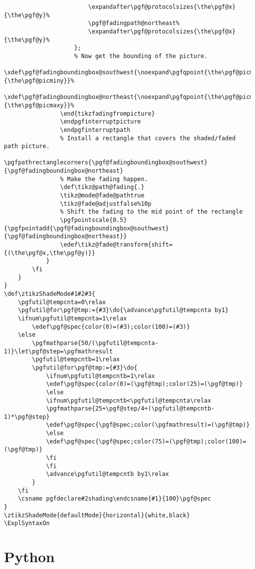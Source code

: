 \begin{verbatim}
                        \expandafter\pgf@protocolsizes{\the\pgf@x}{\the\pgf@y}%
                        \pgf@fadingpath@northeast%
                        \expandafter\pgf@protocolsizes{\the\pgf@x}{\the\pgf@y}%
                    };
                    % Now get the bounding of the picture.
                    \xdef\pgf@fadingboundingbox@southwest{\noexpand\pgfqpoint{\the\pgf@picminx}{\the\pgf@picminy}}%
                    \xdef\pgf@fadingboundingbox@northeast{\noexpand\pgfqpoint{\the\pgf@picmaxx}{\the\pgf@picmaxy}}%
                \end{tikzfadingfrompicture}
                \endpgfinterruptpicture
                \endpgfinterruptpath
                % Install a rectangle that covers the shaded/faded path picture.                                
                \pgfpathrectanglecorners{\pgf@fadingboundingbox@southwest}{\pgf@fadingboundingbox@northeast}
                % Make the fading happen.
                \def\tikz@path@fading{.}
                \tikz@mode@fade@pathtrue
                \tikz@fade@adjustfalse%10p
                % Shift the fading to the mid point of the rectangle
                \pgfpointscale{0.5}{\pgfpointadd{\pgf@fadingboundingbox@southwest}{\pgf@fadingboundingbox@northeast}}
                \edef\tikz@fade@transform{shift={(\the\pgf@x,\the\pgf@y)}}
            }
        \fi
    }
}
\def\ztikzShadeMode#1#2#3{
    \pgfutil@tempcnta=0\relax
    \pgfutil@for\pgf@tmp:={#3}\do{\advance\pgfutil@tempcnta by1}
    \ifnum\pgfutil@tempcnta=1\relax
        \edef\pgf@spec{color(0)=(#3);color(100)=(#3)}
    \else
        \pgfmathparse{50/(\pgfutil@tempcnta-1)}\let\pgf@step=\pgfmathresult
        \pgfutil@tempcntb=1\relax
        \pgfutil@for\pgf@tmp:={#3}\do{
            \ifnum\pgfutil@tempcntb=1\relax
            \edef\pgf@spec{color(0)=(\pgf@tmp);color(25)=(\pgf@tmp)}
            \else
            \ifnum\pgfutil@tempcntb<\pgfutil@tempcnta\relax
            \pgfmathparse{25+\pgf@step/4+(\pgfutil@tempcntb-1)*\pgf@step}
            \edef\pgf@spec{\pgf@spec;color(\pgfmathresult)=(\pgf@tmp)}
            \else
            \edef\pgf@spec{\pgf@spec;color(75)=(\pgf@tmp);color(100)=(\pgf@tmp)}
            \fi
            \fi
            \advance\pgfutil@tempcntb by1\relax
        }
    \fi
    \csname pgfdeclare#2shading\endcsname{#1}{100}\pgf@spec
}
\ztikzShadeMode{defaultMode}{horizontal}{white,black}
\ExplSyntaxOn
\end{verbatim}


\section{Python}
